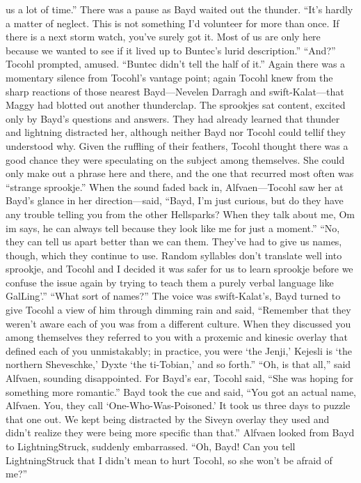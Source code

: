 \documentclass[9pt]{article}
\begin{document}
us a lot of time.”
There was a pause as Bayd waited out the thunder. “It’s hardly a matter of neglect. This is not
something I’d volunteer for more than once. If there is a next storm watch, you’ve surely got it. Most of
us are only here because we wanted to see if it lived up to Buntec’s lurid description.”
“And?” Tocohl prompted, amused.
“Buntec didn’t tell the half of it.”
Again there was a momentary silence from Tocohl’s vantage point; again Tocohl knew from the
sharp reactions of those nearest Bayd—Nevelen Darragh and swift-Kalat—that Maggy had blotted out
another thunderclap. The sprookjes sat content, excited only by Bayd’s questions and answers. They
had already learned that thunder and lightning distracted her, although neither Bayd nor Tocohl could tellif they understood why.
Given the ruffling of their feathers, Tocohl thought there was a good chance they were speculating on
the subject among themselves. She could only make out a phrase here and there, and the one that
recurred most often was “strange sprookje.”
When the sound faded back in, Alfvaen—Tocohl saw her at Bayd’s glance in her direction—said,
“Bayd, I’m just curious, but do they have any trouble telling you from the other Hellsparks? When they
talk about me, Om im says, he can always tell because they look like me for just a moment.”
“No, they can tell us apart better than we can them. They’ve had to give us names, though, which
they continue to use. Random syllables don’t translate well into sprookje, and Tocohl and I decided it
was safer for us to learn sprookje before we confuse the issue again by trying to teach them a purely
verbal language like GalLing’.”
“What sort of names?” The voice was swift-Kalat’s,
Bayd turned to give Tocohl a view of him through dimming rain and said, “Remember that they
weren’t aware each of you was from a different culture. When they discussed you among themselves
they referred to you with a proxemic and kinesic overlay that defined each of you unmistakably; in
practice, you were ‘the Jenji,’ Kejesli is ‘the northern Sheveschke,’ Dyxte ‘the ti-Tobian,’ and so forth.”
“Oh, is that all,” said Alfvaen, sounding disappointed.
For Bayd’s ear, Tocohl said, “She was hoping for something more romantic.”
Bayd took the cue and said, “You got an actual name, Alfvaen. You, they call
‘One-Who-Was-Poisoned.’ It took us three days to puzzle that one out. We kept being distracted by
the Siveyn overlay they used and didn’t realize they were being more specific than that.”
Alfvaen looked from Bayd to LightningStruck, suddenly embarrassed. “Oh, Bayd! Can you tell
LightningStruck that I didn’t mean to hurt Tocohl, so she won’t be afraid of me?”
\end{document}

